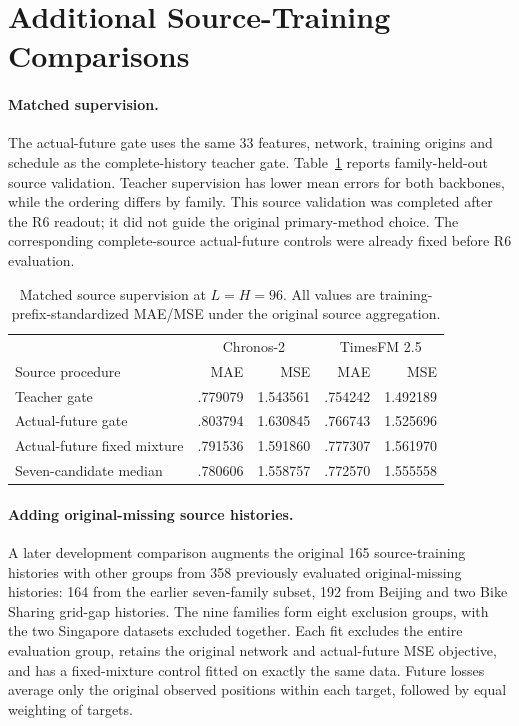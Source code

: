 \section{Additional Source-Training Comparisons}
\label{app:source-controls}

\paragraph{Matched supervision.}
The actual-future gate uses the same 33 features, network, training origins and schedule as the complete-history teacher gate. Table~\ref{tab:r6_source_labels} reports family-held-out source validation. Teacher supervision has lower mean errors for both backbones, while the ordering differs by family. This source validation was completed after the R6 readout; it did not guide the original primary-method choice. The corresponding complete-source actual-future controls were already fixed before R6 evaluation.

\begin{table}[ht]
\centering
\small
\caption{Matched source supervision at $L=H=96$. All values are training-prefix-standardized MAE/MSE under the original source aggregation.}
\label{tab:r6_source_labels}
\begin{tabular}{lrrrr}
\toprule
 & \multicolumn{2}{c}{Chronos-2} & \multicolumn{2}{c}{TimesFM 2.5}\\
Source procedure & MAE & MSE & MAE & MSE\\
\midrule
Teacher gate & .779079 & 1.543561 & .754242 & 1.492189\\
Actual-future gate & .803794 & 1.630845 & .766743 & 1.525696\\
Actual-future fixed mixture & .791536 & 1.591860 & .777307 & 1.561970\\
Seven-candidate median & .780606 & 1.558757 & .772570 & 1.555558\\
\bottomrule
\end{tabular}
\end{table}

\paragraph{Adding original-missing source histories.}
A later development comparison augments the original 165 source-training histories with other groups from 358 previously evaluated original-missing histories: 164 from the earlier seven-family subset, 192 from Beijing and two Bike Sharing grid-gap histories. The nine families form eight exclusion groups, with the two Singapore datasets excluded together. Each fit excludes the entire evaluation group, retains the original network and actual-future MSE objective, and has a fixed-mixture control fitted on exactly the same data. Future losses average only the original observed positions within each target, followed by equal weighting of targets.

